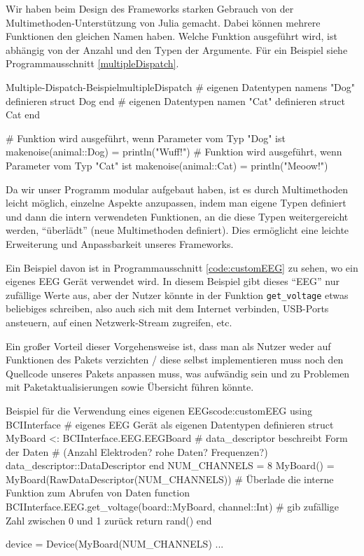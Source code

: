 \documentclass[10pt]{article}
\newcommand{\coderef}[1]{Programmausschnitt \ref{#1}}
\begin{document}
Wir haben beim Design des Frameworks starken Gebrauch von der Multimethoden-Unterstützung von Julia gemacht.
Dabei können mehrere Funktionen den gleichen Namen haben. Welche Funktion ausgeführt wird, ist abhängig von der Anzahl und den Typen der Argumente. Für ein Beispiel siehe \coderef{multipleDispatch}.

\begin{code}{Multiple-Dispatch-Beispiel}{multipleDispatch}
# eigenen Datentypen namens "Dog" definieren
struct Dog end
# eigenen Datentypen namen "Cat" definieren
struct Cat end

# Funktion wird ausgeführt, wenn Parameter vom Typ "Dog" ist
makenoise(animal::Dog) = println("Wuff!")
# Funktion wird ausgeführt, wenn Parameter vom Typ "Cat" ist
makenoise(animal::Cat) = println("Meoow!")
\end{code}

Da wir unser Programm modular aufgebaut haben, ist es durch Multimethoden leicht möglich, einzelne Aspekte anzupassen, indem man eigene Typen definiert und dann die intern verwendeten Funktionen, an die diese Typen weitergereicht werden, \enquote{überlädt} (neue Multimethoden definiert). Dies ermöglicht eine leichte Erweiterung und Anpassbarkeit unseres Frameworks.

Ein Beispiel davon ist in \coderef{code:customEEG} zu sehen, wo ein eigenes EEG Gerät verwendet wird. In diesem Beispiel gibt dieses \enquote{EEG} nur zufällige Werte aus, aber der Nutzer könnte in der Funktion \texttt{get_voltage} etwas beliebiges schreiben, also auch sich mit dem Internet verbinden, USB-Ports ansteuern, auf einen Netzwerk-Stream zugreifen, etc. 

Ein großer Vorteil dieser Vorgehensweise ist, dass man als Nutzer weder auf Funktionen des Pakets verzichten / diese selbst implementieren muss noch den Quellcode unseres Pakets anpassen muss, was aufwändig sein und zu Problemen mit Paketaktualisierungen sowie Übersicht führen könnte. 

\begin{code}{Beispiel für die Verwendung eines eigenen EEGs}{code:customEEG}
using BCIInterface
# eigenes EEG Gerät als eigenen Datentypen definieren
struct MyBoard <: BCIInterface.EEG.EEGBoard
    # data_descriptor beschreibt Form der Daten
    # (Anzahl Elektroden? rohe Daten? Frequenzen?)
    data_descriptor::DataDescriptor
end
NUM_CHANNELS = 8
MyBoard() = MyBoard(RawDataDescriptor(NUM_CHANNELS))
# Überlade die interne Funktion zum Abrufen von Daten
function BCIInterface.EEG.get_voltage(board::MyBoard, channel::Int)
    # gib zufällige Zahl zwischen 0 und 1 zurück
    return rand()
end

device = Device(MyBoard(NUM_CHANNELS)
...
\end{code}
\end{document}
